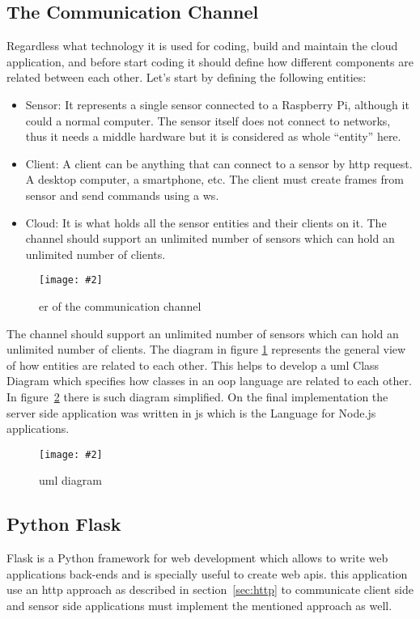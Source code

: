 \documentclass[hidelinks,11pt,a4paper,oneside,article]{memoir}
\newcommand{\putimage}[3][10] %
{
\begin{figure}[h]
	\centering
	\captionsetup{justification=centering}
	\texttt{[image: \#2]}
	\caption{#3}
	\label{fig:#2}
\end{figure}
}
\begin{document}
\subsection{The Communication Channel}\label{sec:the-communication-channel}
Regardless what technology it is used for coding, build and maintain the cloud application, and before start coding it should define how different components are related between each other.
Let’s start by defining the following entities:
\begin{itemize}
    \item Sensor: It represents a single sensor connected to a Raspberry Pi, although it could a normal computer. The sensor itself does not connect to networks, thus it needs a middle hardware but it is considered as whole “entity” here.
    \item Client: A client can be anything that can connect to a sensor by \gls{http} request. A desktop computer, a smartphone, etc. The client must create frames from sensor and send commands using a \gls{ws}.
    \item Cloud: It is what holds all the sensor entities and their clients on it.
    The channel should support an unlimited number of sensors which can hold an unlimited number of clients.
\end{itemize}
\putimage[15]{channel-er}{\acrlong{er} of the communication channel}
The channel should support an unlimited number of sensors which can hold an unlimited number of clients.
The diagram in figure \ref{fig:channel-er} represents the general view of how entities are related to each other. This helps to develop a \gls{uml} Class Diagram which specifies how classes in an \gls{oop} language are related to each other. In figure~\ref{fig:channel-uml} there is such diagram simplified.
On the final implementation the server side application was written in \gls{js} which is the Language for Node.js applications.
\putimage[15]{channel-uml}{\gls{uml} diagram}



\subsection{Python Flask}
Flask is a Python framework for web development which allows to write web applications back-ends and is specially useful to create web \gls{api}s. this application use an \gls{http} approach as described in section~\ref{sec:http} to communicate client side and sensor side applications must implement the mentioned approach as well.
\end{document}
